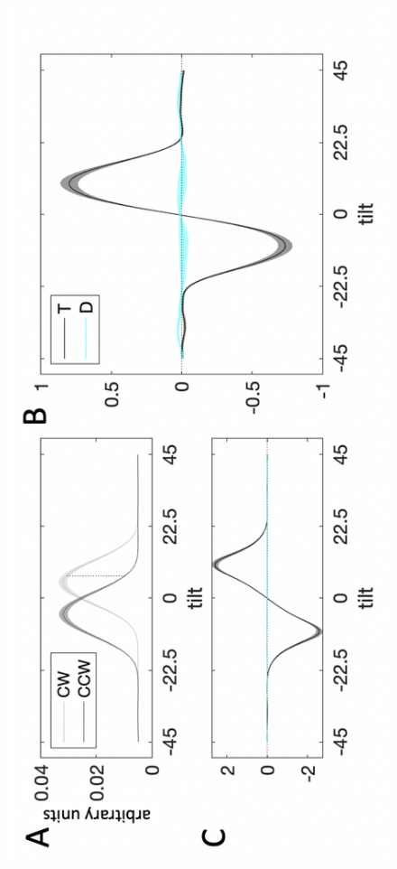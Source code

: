 \documentclass[a4paper, nobind]{templates/ociamthesis}
\begin{document}
\begin{figure}
 
 {\centering \includegraphics[width=1\linewidth]{figures/distr-kernels-a} 
 
}
\end{figure}
\end{document}

